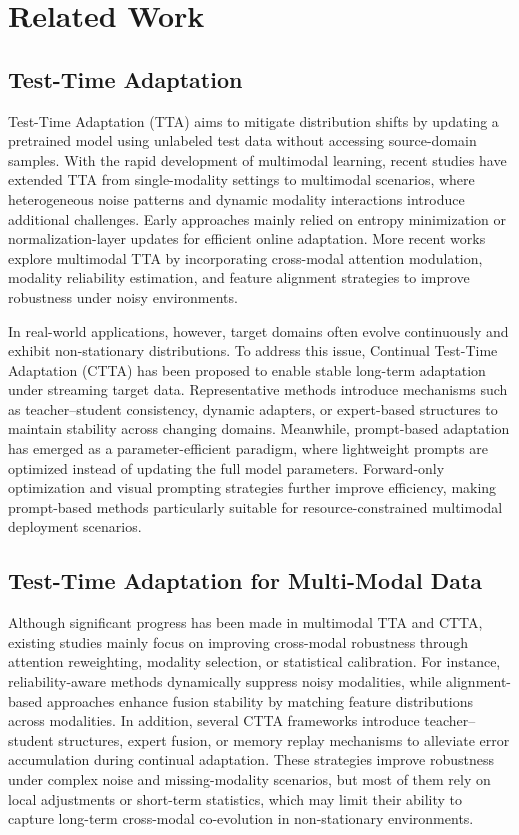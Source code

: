 

\section{Related Work}
\label{Related Work}


\subsection{Test-Time Adaptation}

Test-Time Adaptation (TTA) aims to mitigate distribution shifts by updating a pretrained model using unlabeled test data without accessing source-domain samples. With the rapid development of multimodal learning, recent studies have extended TTA from single-modality settings to multimodal scenarios, where heterogeneous noise patterns and dynamic modality interactions introduce additional challenges. Early approaches mainly relied on entropy minimization or normalization-layer updates for efficient online adaptation. More recent works explore multimodal TTA by incorporating cross-modal attention modulation, modality reliability estimation, and feature alignment strategies to improve robustness under noisy environments. 

In real-world applications, however, target domains often evolve continuously and exhibit non-stationary distributions. To address this issue, Continual Test-Time Adaptation (CTTA) has been proposed to enable stable long-term adaptation under streaming target data. Representative methods introduce mechanisms such as teacher--student consistency, dynamic adapters, or expert-based structures to maintain stability across changing domains. Meanwhile, prompt-based adaptation has emerged as a parameter-efficient paradigm, where lightweight prompts are optimized instead of updating the full model parameters. Forward-only optimization and visual prompting strategies further improve efficiency, making prompt-based methods particularly suitable for resource-constrained multimodal deployment scenarios.

\subsection{Test-Time Adaptation for Multi-Modal Data}

Although significant progress has been made in multimodal TTA and CTTA, existing studies mainly focus on improving cross-modal robustness through attention reweighting, modality selection, or statistical calibration. For instance, reliability-aware methods dynamically suppress noisy modalities, while alignment-based approaches enhance fusion stability by matching feature distributions across modalities. In addition, several CTTA frameworks introduce teacher--student structures, expert fusion, or memory replay mechanisms to alleviate error accumulation during continual adaptation. These strategies improve robustness under complex noise and missing-modality scenarios, but most of them rely on local adjustments or short-term statistics, which may limit their ability to capture long-term cross-modal co-evolution in non-stationary environments.

